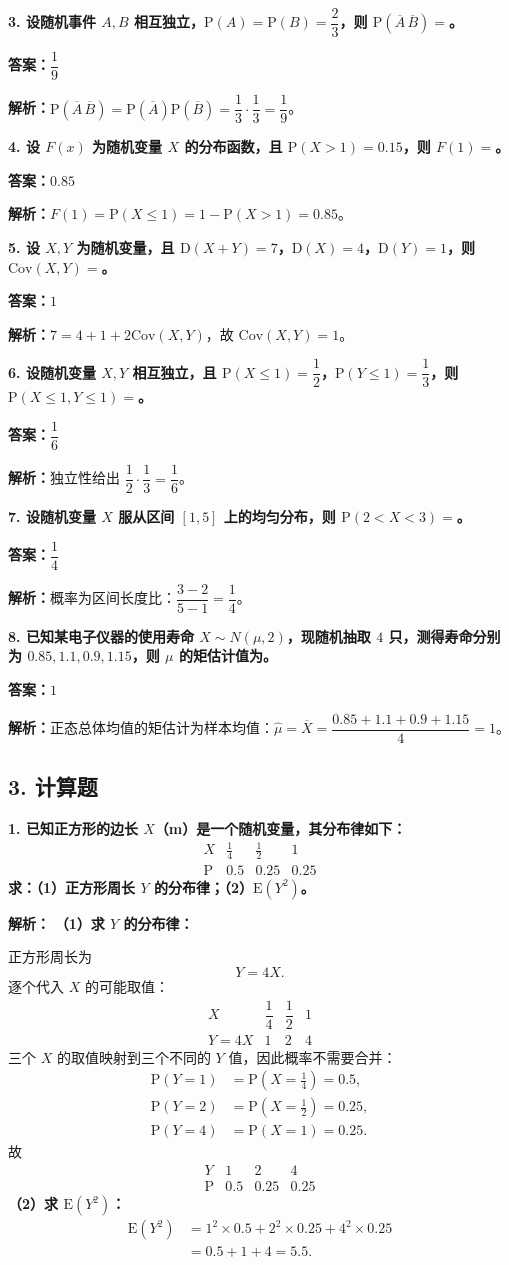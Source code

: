 ﻿\documentclass[UTF8,11pt,a4paper]{ctexart}
\newcommand{\Pp}{\mathrm{P}}
\newcommand{\E}{\mathrm{E}}
\newcommand{\D}{\mathrm{D}}
\newcommand{\Cov}{\mathrm{Cov}}
\newcommand{\Ans}[1]{\par\textbf{答案：}#1\par}
\newcommand{\Ana}[1]{\par\textbf{解析：}#1\par\medskip}
\newcommand{\Q}[1]{\par\textbf{#1}\par}
\begin{document}
\Q{3. 设随机事件 $A,B$ 相互独立，$\Pp(A)=\Pp(B)=\dfrac23$，则 $\Pp(\overline A\,\overline B)=$\underline{\hspace{2cm}}。}
\Ans{$\dfrac19$}
\Ana{$\Pp(\overline A\,\overline B)=\Pp(\overline A)\Pp(\overline B)=\dfrac13\cdot\dfrac13=\dfrac19$。}

\Q{4. 设 $F(x)$ 为随机变量 $X$ 的分布函数，且 $\Pp(X>1)=0.15$，则 $F(1)=$\underline{\hspace{2cm}}。}
\Ans{$0.85$}
\Ana{$F(1)=\Pp(X\le1)=1-\Pp(X>1)=0.85$。}

\Q{5. 设 $X,Y$ 为随机变量，且 $\D(X+Y)=7$，$\D(X)=4$，$\D(Y)=1$，则 $\Cov(X,Y)=$\underline{\hspace{2cm}}。}
\Ans{$1$}
\Ana{$7=4+1+2\Cov(X,Y)$，故 $\Cov(X,Y)=1$。}

\Q{6. 设随机变量 $X,Y$ 相互独立，且 $\Pp(X\le1)=\dfrac12$，$\Pp(Y\le1)=\dfrac13$，则 $\Pp(X\le1,Y\le1)=$\underline{\hspace{2cm}}。}
\Ans{$\dfrac16$}
\Ana{独立性给出 $\dfrac12\cdot\dfrac13=\dfrac16$。}

\Q{7. 设随机变量 $X$ 服从区间 $[1,5]$ 上的均匀分布，则 $\Pp(2<X<3)=$\underline{\hspace{2cm}}。}
\Ans{$\dfrac14$}
\Ana{概率为区间长度比：$\dfrac{3-2}{5-1}=\dfrac14$。}

\Q{8. 已知某电子仪器的使用寿命 $X\sim N(\mu,2)$，现随机抽取 $4$ 只，测得寿命分别为 $0.85,1.1,0.9,1.15$，则 $\mu$ 的矩估计值为\underline{\hspace{2cm}}。}
\Ans{$1$}
\Ana{正态总体均值的矩估计为样本均值：$\hat\mu=\overline X=\dfrac{0.85+1.1+0.9+1.15}{4}=1$。}

\subsection*{3. 计算题}
\Q{1. 已知正方形的边长 $X$（m）是一个随机变量，其分布律如下：
\[
\begin{array}{c|ccc}X&\frac14&\frac12&1\\\hline \Pp&0.5&0.25&0.25\end{array}
\]
求：（1）正方形周长 $Y$ 的分布律；（2）$\E(Y^2)$。}
\Ana{
\textbf{（1）求 $Y$ 的分布律：}

正方形周长为
\[
Y=4X.
\]
逐个代入 $X$ 的可能取值：
\[
\begin{array}{c|ccc}
X&\dfrac14&\dfrac12&1\\\hline
Y=4X&1&2&4
\end{array}
\]
三个 $X$ 的取值映射到三个不同的 $Y$ 值，因此概率不需要合并：
\[
\begin{aligned}
\Pp(Y=1)&=\Pp\left(X=\frac14\right)=0.5,\\
\Pp(Y=2)&=\Pp\left(X=\frac12\right)=0.25,\\
\Pp(Y=4)&=\Pp(X=1)=0.25.
\end{aligned}
\]
故
\[
\begin{array}{c|ccc}
Y&1&2&4\\\hline
\Pp&0.5&0.25&0.25
\end{array}
\]
\textbf{（2）求 $\E(Y^2)$：}
\[
\begin{aligned}
\E(Y^2)
&=1^2\times0.5+2^2\times0.25+4^2\times0.25\\
&=0.5+1+4=5.5.
\end{aligned}
\]
}
\end{document}
